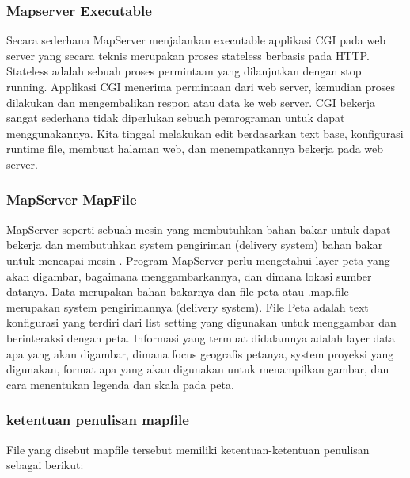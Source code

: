 	\subsubsection {Mapserver Executable}
		Secara sederhana MapServer menjalankan executable applikasi CGI pada web server yang secara teknis merupakan proses
 		stateless berbasis pada HTTP. Stateless adalah sebuah proses permintaan yang dilanjutkan dengan stop running. Applikasi CGI 		
		menerima permintaan dari web server, kemudian proses dilakukan dan mengembalikan respon atau data ke web server. CGI bekerja 		
		sangat sederhana tidak diperlukan sebuah pemrograman untuk dapat menggunakannya. Kita tinggal melakukan edit berdasarkan text base,
		konfigurasi runtime file, membuat halaman web, dan menempatkannya bekerja pada web server.
		
	\subsubsection {MapServer MapFile}		MapServer seperti sebuah mesin yang membutuhkan bahan bakar untuk dapat bekerja dan membutuhkan system pengiriman (delivery system) bahan bakar untuk mencapai mesin . 
		Program MapServer perlu mengetahui layer peta yang akan digambar, bagaimana menggambarkannya, dan dimana lokasi sumber datanya. 
		Data merupakan bahan bakarnya dan file peta atau .map.file merupakan system pengirimannya (delivery system). 
		File Peta adalah text konfigurasi yang terdiri dari list setting yang digunakan untuk menggambar dan berinteraksi dengan peta. 
		Informasi yang termuat didalamnya adalah layer data apa yang akan digambar, dimana focus geografis petanya, system proyeksi yang digunakan, 
		format apa yang akan digunakan untuk menampilkan gambar, dan cara menentukan legenda dan skala pada peta.
		
	\subsubsection{ketentuan penulisan mapfile}
		File yang disebut mapfile tersebut memiliki ketentuan-ketentuan penulisan sebagai berikut:

